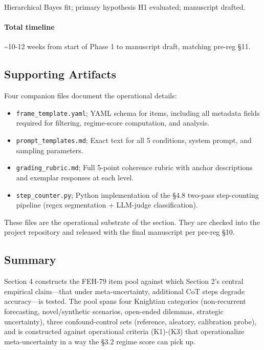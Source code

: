 \documentclass{article}
\providecommand{\tightlist}{\setlength{\itemsep}{0pt}\setlength{\parskip}{0pt}}
\begin{document}
Hierarchical Bayes fit; primary hypothesis H1 evaluated; manuscript
drafted.

\paragraph{Total timeline}\label{total-timeline}

\textasciitilde10-12 weeks from start of Phase 1 to manuscript draft,
matching pre-reg \S{}11.

\subsection{Supporting Artifacts}\label{supporting-artifacts}

Four companion files document the operational details:

\begin{itemize}
\tightlist
\item
  \texttt{frame\_\textasciigrave{}\textasciigrave{}template.yaml}; YAML
  schema for items, including all metadata fields required for
  filtering, regime-score computation, and analysis.
\item
  \texttt{prompt\_templates.md}; Exact text for all 5 conditions, system
  prompt, and sampling parameters.
\item
  \texttt{grading\_rubric.md}; Full 5-point coherence rubric with anchor
  descriptions and exemplar responses at each level.
\item
  \texttt{step\_counter.py}; Python implementation of the \S{}4.8 two-pass
  step-counting pipeline (regex segmentation + LLM-judge
  classification).
\end{itemize}

These files are the operational substrate of the section. They are
checked into the project repository and released with the final
manuscript per pre-reg \S{}10.

\subsection{Summary}\label{summary-1}

Section 4 constructs the FEH-79 item pool against which Section 2's
central empirical claim---that under meta-uncertainty, additional CoT
steps degrade accuracy---is tested. The pool spans four Knightian
categories (non-recurrent forecasting, novel/synthetic scenarios,
open-ended dilemmas, strategic uncertainty), three confound-control sets
(reference, aleatory, calibration probe), and is constructed against
operational criteria (K1)-(K3) that operationalize meta-uncertainty in a
way the \S{}3.2 regime score can pick up.
\end{document}
